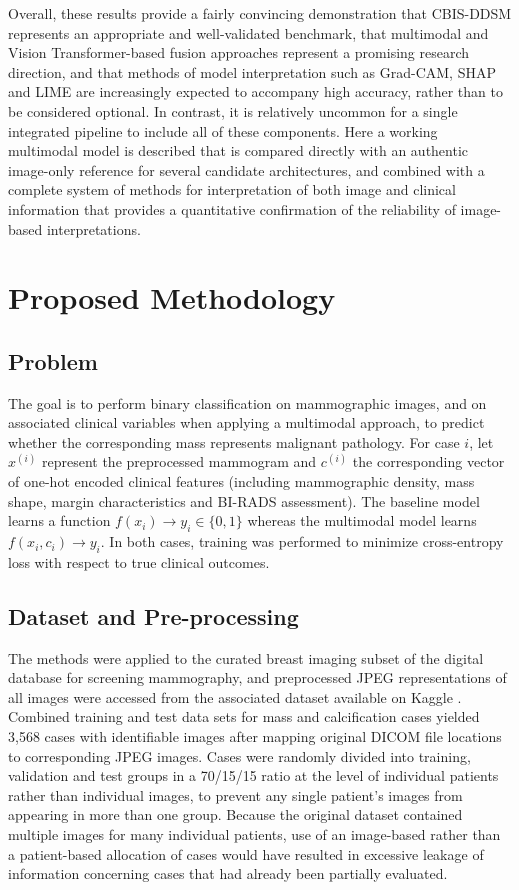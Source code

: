 Overall, these results provide a fairly convincing demonstration that CBIS-DDSM represents an appropriate and well-validated benchmark, that multimodal and Vision Transformer-based fusion approaches represent a promising research direction, and that methods of model interpretation such as Grad-CAM, SHAP and LIME are increasingly expected to accompany high accuracy, rather than to be considered optional. In contrast, it is relatively uncommon for a single integrated pipeline to include all of these components. Here a working multimodal model is described that is compared directly with an authentic image-only reference for several candidate architectures, and combined with a complete system of methods for interpretation of both image and clinical information that provides a quantitative confirmation of the reliability of image-based interpretations.

\section{Proposed Methodology}
\label{sec:methodology}

\subsection{Problem}
The goal is to perform binary classification on mammographic images, and on associated clinical variables when applying a multimodal approach, to predict whether the corresponding mass represents malignant pathology. For case $i$, let $x^{(i)}$ represent the preprocessed mammogram and $c^{(i)}$ the corresponding vector of one-hot encoded clinical features (including mammographic density, mass shape, margin characteristics and BI-RADS assessment). The baseline model learns a function $f(x_i) \to y_i \in \{0,1\}$ whereas the multimodal model learns $f(x_i, c_i) \to y_i$. In both cases, training was performed to minimize cross-entropy loss with respect to true clinical outcomes.

\subsection{Dataset and Pre-processing}
The methods were applied to the curated breast imaging subset of the digital database for screening mammography, and preprocessed JPEG representations of all images were accessed from the associated dataset available on Kaggle \citep{cbisddsm}. Combined training and test data sets for mass and calcification cases yielded 3{,}568 cases with identifiable images after mapping original DICOM file locations to corresponding JPEG images. Cases were randomly divided into training, validation and test groups in a 70/15/15 ratio at the level of individual patients rather than individual images, to prevent any single patient's images from appearing in more than one group. Because the original dataset contained multiple images for many individual patients, use of an image-based rather than a patient-based allocation of cases would have resulted in excessive leakage of information concerning cases that had already been partially evaluated.


